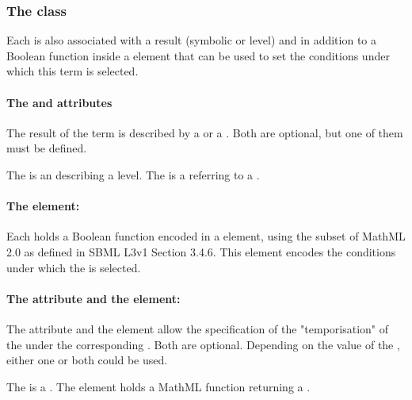 

\subsubsection{The  class}
\label{sec:function-term}

Each \FunctionTerm is also associated with a result (symbolic or level) and in addition to a Boolean function inside a  element that can be used to set the conditions under which this term is selected.

\paragraph{The  and  attributes}
The result of the term is described by a  or a . Both are optional, but one of them must be defined.

The  is an  describing a level. The  is a  referring to a \SymbolicValue.

\paragraph{The  element:}
Each  holds a Boolean function encoded in a  element, using the subset of MathML 2.0 as defined in SBML L3v1 Section 3.4.6.
This element encodes the conditions under which the \FunctionTerm is selected.

\paragraph{The  attribute and the  element:}
The attribute  and the element  allow the specification of the "temporisation" of the \Transition under the corresponding . Both are optional. Depending on the value of the , either one or both could be used.

The  is a . The element  holds a MathML function returning a . 


